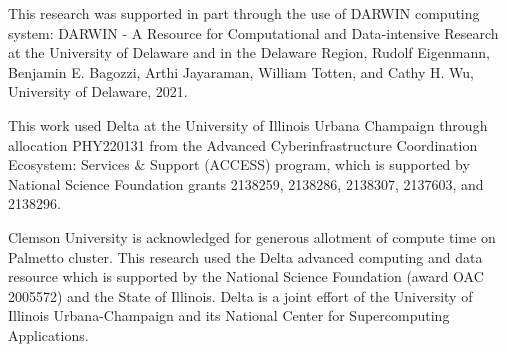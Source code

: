 This research was supported in part through the use of DARWIN computing system: DARWIN - A Resource for Computational 
and Data-intensive Research at the University of Delaware and in the Delaware Region, Rudolf Eigenmann, Benjamin E. 
Bagozzi, Arthi Jayaraman, William Totten, and Cathy H. Wu, University of Delaware, 2021.

This work used Delta at the University of Illinois Urbana Champaign through allocation PHY220131 from the Advanced 
Cyberinfrastructure Coordination Ecosystem: Services $\&$ Support (ACCESS) program, which is supported by National 
Science Foundation grants 2138259, 2138286, 2138307, 2137603, and 2138296. 

Clemson University is acknowledged for generous allotment of compute time on Palmetto cluster. This research used the 
Delta advanced computing and data resource which is supported by the National Science Foundation (award OAC 2005572) 
and the State of Illinois. Delta is a joint effort of the University of Illinois Urbana-Champaign and its National 
Center for Supercomputing Applications. 